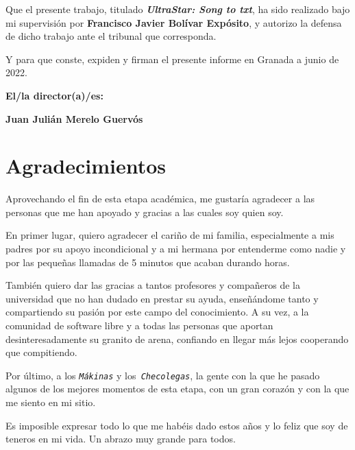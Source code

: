 \vspace{0.5cm}

Que el presente trabajo, titulado \textit{\textbf{UltraStar: Song to txt}},
ha sido realizado bajo mi supervisión por \textbf{Francisco Javier Bolívar Expósito}, y autorizo la defensa de dicho trabajo ante el tribunal
que corresponda.

\vspace{0.5cm}

Y para que conste, expiden y firman el presente informe en Granada a junio de 2022.

\vspace{1cm}

\textbf{El/la director(a)/es: }

\vspace{5cm}

\noindent \textbf{Juan Julián Merelo Guervós}

\chapter*{Agradecimientos}

Aprovechando el fin de esta etapa académica, me gustaría agradecer a las personas que me han apoyado y gracias a las cuales soy quien soy.

En primer lugar, quiero agradecer el cariño de mi familia, especialmente a mis padres por su apoyo incondicional y a mi hermana por entenderme como nadie y por las pequeñas llamadas de 5 minutos que acaban durando horas.

También quiero dar las gracias a tantos profesores y compañeros de la universidad que no han dudado en prestar su ayuda, enseñándome tanto y compartiendo su pasión por este campo del conocimiento. A su vez, a la comunidad de software libre y a todas las personas que aportan desinteresadamente su granito de arena, confiando en llegar más lejos cooperando que compitiendo. 

Por último, a los \texttt{\normalfont\textit{Mákinas}} y los\texttt{\normalfont\textit{ Checolegas}}, la gente con la que he pasado algunos de los mejores momentos de esta etapa, con un gran corazón y con la que me siento en mi sitio.

Es imposible expresar todo lo que me habéis dado estos años y lo feliz que soy de teneros en mi vida. Un abrazo muy grande para todos.

\vspace*{1cm}

